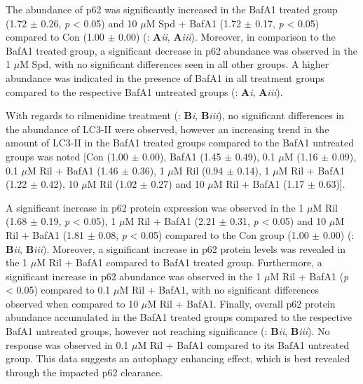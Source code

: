 The abundance of p62 was significantly increased in the BafA1 treated group (1.72 $\pm$ 0.26, \textit{p} < 0.05) and  10 $\mu$M Spd + BafA1 (1.72 $\pm$ 0.17, \textit{p} < 0.05) compared to Con (1.00 $\pm$ 0.00) (: \textbf{A}\textit{ii}, \textbf{A}\textit{iii}). Moreover, in comparison to the BafA1 treated group, a significant decrease in p62 abundance was observed in the 1 $\mu$M Spd, with no significant differences seen in all other groups. A higher abundance was indicated in the presence of BafA1 in all treatment groups compared to the respective BafA1 untreated groups (: \textbf{A}\textit{i}, \textbf{A}\textit{iii}).

With regards to rilmenidine treatment (: \textbf{B}\textit{i}, \textbf{B}\textit{iii}), no significant differences in the abundance of LC3-II were observed, however an increasing trend in the amount of LC3-II in the BafA1 treated groups compared to the BafA1 untreated groups was noted [Con (1.00 $\pm$ 0.00), BafA1 (1.45 $\pm$ 0.49), 0.1 $\mu$M (1.16 $\pm$ 0.09), 0.1 $\mu$M Ril + BafA1 (1.46 $\pm$ 0.36), 1 $\mu$M Ril (0.94 $\pm$ 0.14), 1 $\mu$M Ril + BafA1 (1.22 $\pm$ 0.42), 10 $\mu$M Ril (1.02 $\pm$ 0.27) and 10 $\mu$M Ril + BafA1 (1.17 $\pm$ 0.63)].

A significant increase in p62 protein expression was observed in the 1 $\mu$M Ril (1.68 $\pm$ 0.19, \textit{p} < 0.05), 1 $\mu$M Ril + BafA1 (2.21 $\pm$ 0.31, \textit{p} < 0.05) and 10 $\mu$M Ril + BafA1 (1.81 $\pm$ 0.08, \textit{p} < 0.05) compared to the Con group (1.00 $\pm$ 0.00) (: \textbf{B}\textit{ii}, \textbf{B}\textit{iii}). Moreover, a significant increase in p62 protein levels was revealed in the 1 $\mu$M Ril + BafA1 compared to BafA1 treated group. Furthermore, a significant increase in p62 abundance was observed in the 1 $\mu$M Ril + BafA1 (\textit{p} < 0.05) compared to 0.1 $\mu$M Ril + BafA1, with no significant differences observed when compared to 10 $\mu$M Ril + BafA1. Finally, overall p62 protein abundance accumulated in the BafA1 treated groups compared to the respective BafA1 untreated groups, however not reaching significance (: \textbf{B}\textit{ii}, \textbf{B}\textit{iii}). No response was observed in 0.1 $\mu$M Ril + BafA1 compared to its BafA1 untreated group. This data suggests an autophagy enhancing effect, which is best revealed through the impacted p62 clearance.

